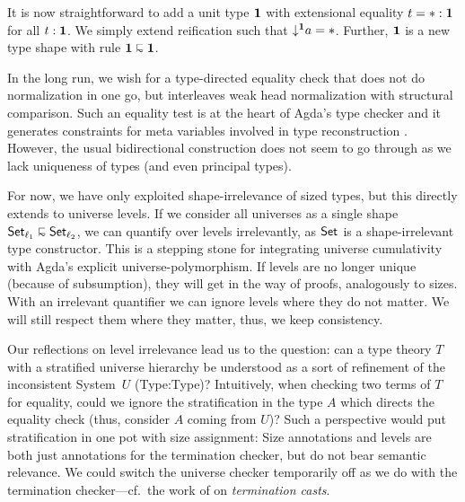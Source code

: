 \documentclass[acmsmall,screen]{acmart}\settopmatter{}
\begin{document}
It is now straightforward to add a unit type $\mathbf{1}$ with extensional equality $t = {*} : \mathbf{1}$ for all $t : \mathbf{1}$.  We simply extend reification such that $\mathord{\downarrow^{\mathbf{1}}} a = {*}$.  Further, $\mathbf{1}$ is a new type shape with rule $\One \shape \One$.


In the long run, we wish for a type-directed equality check that does
not do normalization in one go, but interleaves weak head normalization
with structural comparison.
Such an equality test is at the heart of Agda's type
checker and it generates constraints for meta variables
involved in type reconstruction \cite{norell:PhD}.  However, the usual
bidirectional construction \cite{abelScherer:types10} does not seem to
go through as we lack uniqueness of types (and even principal types).

For now, we have only exploited shape-irrelevance of sized types, but this directly extends to universe levels.  If we consider all universes as a single shape $\Set[\ell_1] \shape \Set[\ell_2]$, we can quantify over levels irrelevantly, as $\mathsf{Set}_{}$ is a shape-irrelevant type constructor.  This is a stepping stone for integrating universe cumulativity with Agda's explicit universe-polymorphism.  If levels are no longer unique (because of subsumption), they will get in the way of proofs, analogously to sizes.  With an irrelevant quantifier we can ignore levels where they do not matter.  We will still respect them where they matter, thus, we keep consistency.

Our reflections on level irrelevance lead us to the question: can a type theory $T$ with a stratified universe hierarchy be understood as a sort of refinement of the inconsistent System~$U$ (Type:Type)?  Intuitively, when checking two terms of $T$ for equality, could we ignore the stratification in the type $A$ which directs the equality check (thus, consider $A$ coming from $U$)?
Such a perspective would put stratification in one pot with size assignment:  Size annotations and levels are both just annotations for the termination checker, but do not bear semantic relevance.  We could switch the universe checker temporarily off as we do with the termination checker---cf.\ the work of \citet{stumpSjobergWeirich:par10} on \emph{termination casts}.
\end{document}

